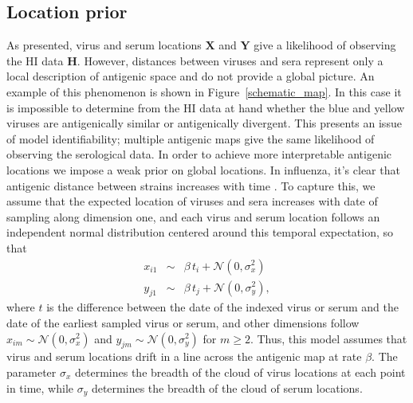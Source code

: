 \documentclass[11pt,oneside,letterpaper]{article}
\newcommand{\viruses}{\mathbf{X}}					%
\newcommand{\sera}{\mathbf{Y}}						%
\newcommand{\virussd}{\sigma_x}						%
\newcommand{\serumsd}{\sigma_y}						%
\newcommand{\normal}{\mathcal{N}}					%
\begin{document}
\subsection*{Location prior}

As presented, virus and serum locations $\viruses$ and $\sera$ give a likelihood of observing the HI data $\mathbf{H}$.
However, distances between viruses and sera represent only a local description of antigenic space and do not provide a global picture.
An example of this phenomenon is shown in Figure~\ref{schematic_map}.
In this case it is impossible to determine from the HI data at hand whether the blue and yellow viruses are antigenically similar or antigenically divergent. 
This presents an issue of model identifiability; multiple antigenic maps give the same likelihood of observing the serological data.
In order to achieve more interpretable antigenic locations we impose a weak prior on global locations.
In influenza, it's clear that antigenic distance between strains increases with time \cite{Smith04,Cai10}.
To capture this, we assume that the expected location of viruses and sera increases with date of sampling along dimension one, and each virus and serum location follows an independent normal distribution centered around this temporal expectation, so that
\begin{eqnarray}
	x_{i1} &\sim& \beta \, t_i + \normal(0, \virussd^2) \nonumber \\
	y_{j1} &\sim& \beta \, t_j + \normal(0, \serumsd^2),
\end{eqnarray}
where $t$ is the difference between the date of the indexed virus or serum and the date of the earliest sampled virus or serum, and other dimensions follow $x_{im} \sim \normal(0, \virussd^2)$ and $y_{jm} \sim \normal(0, \serumsd^2)$ for $m\ge2$.
Thus, this model assumes that virus and serum locations drift in a line across the antigenic map at rate $\beta$.
The parameter $\virussd$ determines the breadth of the cloud of virus locations at each point in time, while $\serumsd$ determines the breadth of the cloud of serum locations.
\end{document}
